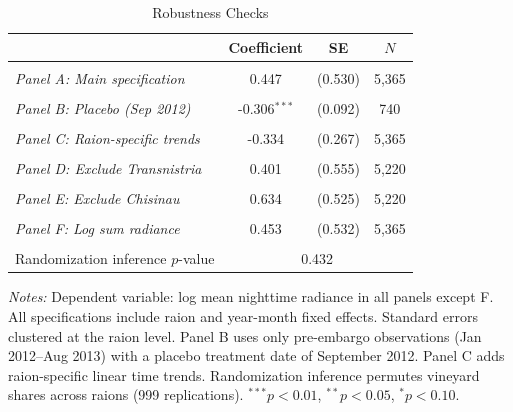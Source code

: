 \begin{table}[t]
\centering
\caption{Robustness Checks}
\label{tab:robust}
\begin{tabular}{lccc}
\hline\hline
 & Coefficient & SE & $N$ \\
\hline
\\[-1em]
\textit{Panel A: Main specification} & 0.447 & (0.530) & 5,365 \\
\\[-0.5em]
\textit{Panel B: Placebo (Sep 2012)} & -0.306$^{***}$ & (0.092) & 740 \\
\\[-0.5em]
\textit{Panel C: Raion-specific trends} & -0.334 & (0.267) & 5,365 \\
\\[-0.5em]
\textit{Panel D: Exclude Transnistria} & 0.401 & (0.555) & 5,220 \\
\\[-0.5em]
\textit{Panel E: Exclude Chisinau} & 0.634 & (0.525) & 5,220 \\
\\[-0.5em]
\textit{Panel F: Log sum radiance} & 0.453 & (0.532) & 5,365 \\
\\[-0.5em]
\hline
Randomization inference $p$-value & \multicolumn{3}{c}{0.432} \\
\hline\hline
\end{tabular}
\begin{tablenotes}
\item \textit{Notes:} Dependent variable: log mean nighttime radiance in all panels except F.
All specifications include raion and year-month fixed effects.
Standard errors clustered at the raion level. Panel B uses only pre-embargo observations
(Jan 2012--Aug 2013) with a placebo treatment date of September 2012.
Panel C adds raion-specific linear time trends. Randomization inference
permutes vineyard shares across raions (999 replications).
$^{***}p<0.01$, $^{**}p<0.05$, $^{*}p<0.10$.
\end{tablenotes}
\end{table}
